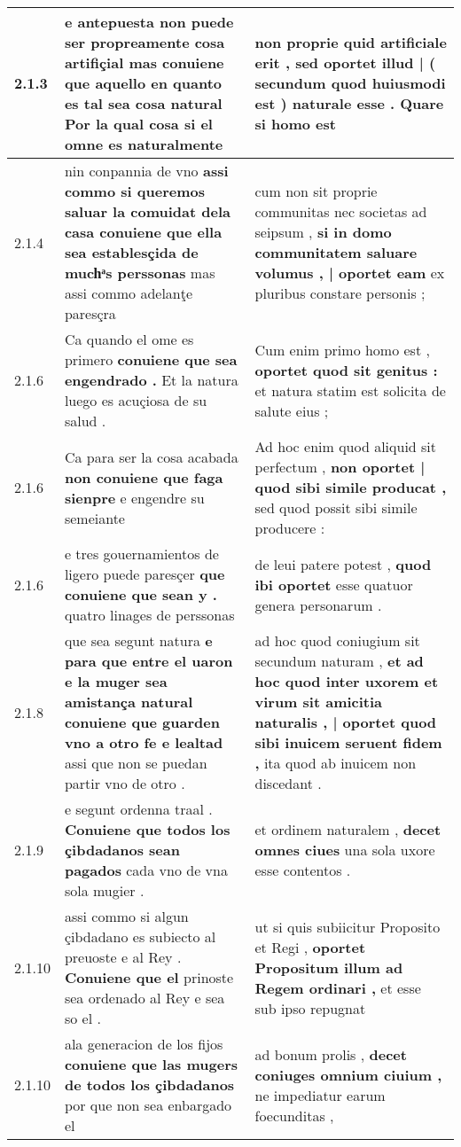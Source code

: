 \begin{tabular}{|p{1cm}|p{6.5cm}|p{6.5cm}|}
2.1.3 & e antepuesta non puede ser propreamente cosa artifiçial \textbf{ mas conuiene que aquello en quanto es tal sea cosa natural } Por la qual cosa si el omne es naturalmente & non proprie quid artificiale erit , \textbf{ sed oportet illud | ( secundum quod huiusmodi est ) naturale esse . } Quare si homo est \\\hline
2.1.4 & nin conpannia de vno \textbf{ assi commo si queremos saluar la comuidat dela casa conuiene que ella sea establesçida de muchͣs perssonas } mas assi commo adelanţe paresçra & cum non sit proprie communitas nec societas ad seipsum , \textbf{ si in domo communitatem saluare volumus , | oportet eam } ex pluribus constare personis ; \\\hline
2.1.6 & Ca quando el ome es primero \textbf{ conuiene que sea engendrado . } Et la natura luego es acuçiosa de su salud . & Cum enim primo homo est , \textbf{ oportet quod sit genitus : } et natura statim est solicita de salute eius ; \\\hline
2.1.6 & Ca para ser la cosa acabada \textbf{ non conuiene que faga sienpre } e engendre su semeiante & Ad hoc enim quod aliquid sit perfectum , \textbf{ non oportet | quod sibi simile producat , } sed quod possit sibi simile producere : \\\hline
2.1.6 & e tres gouernamientos de ligero puede paresçer \textbf{ que conuiene que sean y . } quatro linages de perssonas & de leui patere potest , \textbf{ quod ibi oportet } esse quatuor genera personarum . \\\hline
2.1.8 & que sea segunt natura \textbf{ e para que entre el uaron e la muger sea amistança natural conuiene que guarden vno a otro fe e lealtad } assi que non se puedan partir vno de otro . & ad hoc quod coniugium sit secundum naturam , \textbf{ et ad hoc quod inter uxorem et virum sit amicitia naturalis , | oportet quod sibi inuicem seruent fidem , } ita quod ab inuicem non discedant . \\\hline
2.1.9 & e segunt ordenna traal . \textbf{ Conuiene que todos los çibdadanos sean pagados } cada vno de vna sola mugier . & et ordinem naturalem , \textbf{ decet omnes ciues } una sola uxore esse contentos . \\\hline
2.1.10 & assi commo si algun çibdadano es subiecto al preuoste e al Rey . \textbf{ Conuiene que el } prinoste sea ordenado al Rey e sea so el . & ut si quis subiicitur Proposito et Regi , \textbf{ oportet Propositum illum ad Regem ordinari , } et esse sub ipso repugnat \\\hline
2.1.10 & ala generacion de los fijos \textbf{ conuiene que las mugers de todos los çibdadanos } por que non sea enbargado el & ad bonum prolis , \textbf{ decet coniuges omnium ciuium , } ne impediatur earum foecunditas , \\\hline

\end{tabular}
